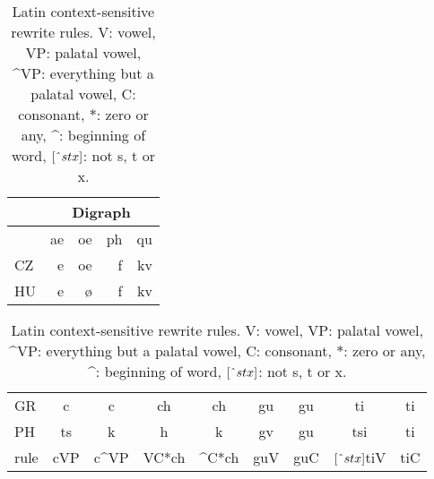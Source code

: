 \documentclass[runningheads,a4paper]{llncs}
\begin{document}
\begin{table}
	\centering
	\caption{Latin digraph context-insensitive rewrite rules.}\label{tbl:digraph}
	\begin{tabular}{l|rrrr}
	\hline
	& \multicolumn{4}{c}{Digraph} \\
	\hline
	   & ae & oe & ph & qu \\
	\hline
	CZ & e & oe & f & kv \\
	HU & e & \o & f & kv \\
	\hline
	\end{tabular}
\vspace*{0.4 cm}
	\centering
	\caption{Latin context-sensitive rewrite rules. V: vowel, VP: palatal vowel, \string^VP: everything but a palatal vowel, C: consonant, $*$: zero or any, \string^: beginning of word, $[\string^stx]$: not s, t or x.}\label{tbl:context}
	\begin{tabular}{l|cc|cc|cc|cc}
	\hline
	GR & c & c & ch & ch & gu & gu & ti & ti \\
	PH & ts & k & h & k & gv & gu & tsi & ti \\
	\hline
	rule & \multicolumn{1}{c|}{cVP} & \multicolumn{1}{c|}{c\string^VP} & \multicolumn{1}{c|}{VC*ch} & \multicolumn{1}{c|}{\string^C*ch} & \multicolumn{1}{c|}{guV} & \multicolumn{1}{c|}{guC} & \multicolumn{1}{c|}{$[\string^stx]$tiV} & \multicolumn{1}{c|}{tiC} \\
	\hline
	\end{tabular}
\end{table}
\end{document}

